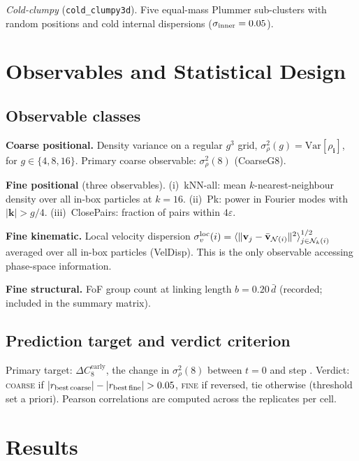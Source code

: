 \documentclass[11pt,a4paper]{article}
\newcommand{\dCearly}{\Delta C_{8}^{\mathrm{early}}}
\newcommand{\sigrho}{\sigma^{2}_{\rho}}
\newcommand{\heps}{\varepsilon}
\begin{document}
\textit{Cold-clumpy} (\texttt{cold\_clumpy3d}).
Five equal-mass Plummer sub-clusters with random positions and cold
internal dispersions ($\sigma_{\rm inner} = 0.05$).


\section{Observables and Statistical Design}
\label{sec:observables}

\subsection{Observable classes}

\textbf{Coarse positional.}
Density variance on a regular $g^3$ grid,
$\sigrho(g) = \mathrm{Var}[\rho_{\mathbf{i}}]$,
for $g \in \{4, 8, 16\}$.
Primary coarse observable: $\sigrho(8)$ (CoarseG8).

\textbf{Fine positional} (three observables).
(i)~kNN-all: mean $k$-nearest-neighbour density over all in-box particles
at $k = 16$.
(ii)~Pk: power in Fourier modes with $|\mathbf{k}| > g/4$.
(iii)~ClosePairs: fraction of pairs within $4\heps$.

\textbf{Fine kinematic.}
Local velocity dispersion
$\sigma_v^{\rm loc}(i) = \langle\|\mathbf{v}_j -
\bar{\mathbf{v}}_{\mathcal{N}(i)}\|^2\rangle^{1/2}_{j\in\mathcal{N}_k(i)}$
averaged over all in-box particles (VelDisp).
This is the only observable accessing phase-space information.

\textbf{Fine structural.}
FoF group count at linking length $b = 0.20\,\bar{d}$ (recorded; included
in the summary matrix).

\subsection{Prediction target and verdict criterion}

Primary target: $\dCearly$, the change in $\sigrho(8)$ between $t=0$ and
step \HEarly{}.
Verdict: \textsc{coarse} if $|r_{\rm best\,coarse}| - |r_{\rm best\,fine}| > 0.05$,
\textsc{fine} if reversed, tie otherwise (threshold set a priori).
Pearson correlations are computed across the \NReplicates{} replicates per cell.


\section{Results}
\label{sec:results}
\end{document}
